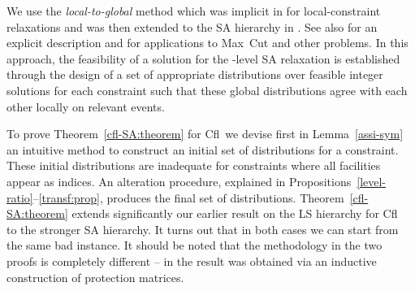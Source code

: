 \documentclass[11pt]{article}
\newcommand{\cfl}{{\sc Cfl}}
\begin{document}
We use the \emph{local-to-global} method which was implicit in
\cite{AroraBLT06} for 
local-constraint
relaxations   and  was   then  extended   to  the   SA   hierarchy  in
\cite{FernandezdlVKM07}. 
See also \cite{GeorgiouMagen} for an explicit description and
\cite{CharikarMM09} for applications to Max~Cut and other
problems.  
In this approach, the feasibility of a solution for the -level SA
relaxation is established through the design of a set of  appropriate
distributions over  feasible integer solutions for each constraint
such that these global distributions agree with each other locally on relevant
events.  
\begin{comment} -------- too technical 
In this approach, we interpret a linearized
product of a set  of variables, namely , as the probability of
occurrence of the event  with respect to
a distribution over integer solutions.  
If there is an assignment  of
values to the linearized variables
appearing at level  of SA such that for each lifted constraint there is a
distribution over some  integer solutions and the values  of the 
variables    coincide   with    the   probability    of    the   event
 with respect to  that distribution, then
 the projection  of  on the  variables
 is  feasible  for  the  relaxation  obtained  at  level    of  the
 hierarchy. 
\end{comment} 
To prove Theorem~\ref{cfl-SA:theorem} for \cfl\ we 
devise first in Lemma~\ref{assi-sym} an intuitive method to construct an initial 
 set of distributions for a constraint. 
These  initial distributions are  inadequate for 
constraints where all facilities appear as indices. 
An alteration procedure,
explained in Propositions~\ref{level-ratio}--\ref{transf:prop}, 
 produces the final set of distributions. 
Theorem~\ref{cfl-SA:theorem} extends
significantly our earlier result on the  
LS hierarchy for \cfl\ \cite{KolliopoulosM13} to the stronger SA
hierarchy. It turns out that in both cases we can start from the same 
bad instance. 
It should be noted that the methodology in the two proofs is completely
different -- in \cite{KolliopoulosM13} the result was obtained via an 
inductive construction of  protection matrices. 
\end{document}
